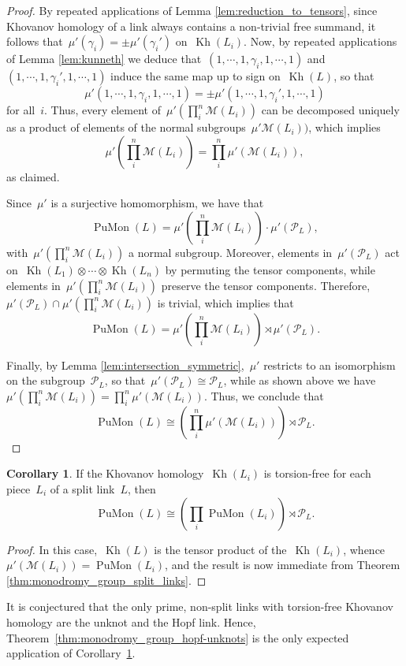 \documentclass{amsart}
\theoremstyle{definition}
\theoremstyle{definition}
\theoremstyle{definition}
\theoremstyle{definition}
\newtheorem{corollary}[theorem]{Corollary}
\newcommand{\calM}{\mathcal{M}}
\newcommand{\calP}{\mathcal{P}} %
\DeclareMathOperator{\PuMon}{PuMon}
\DeclareMathOperator{\Kh}{Kh}
\begin{document}
\begin{proof}
By repeated applications of Lemma \ref{lem:reduction_to_tensors}, since Khovanov homology of a link always contains a non-trivial free summand, it follows that~$\mu'(\gamma_i) = \pm\mu'(\gamma_i')$ on~$\Kh(L_i)$. Now, by repeated applications of Lemma \ref{lem:kunneth} we deduce that~$(1, \cdots, 1, \gamma_i, 1, \cdots, 1)$ and~$(1, \cdots, 1, \gamma_i', 1, \cdots, 1)$ induce the same map up to sign on~$\Kh(L)$, so that 
$$\mu'(1, \cdots, 1, \gamma_i, 1, \cdots, 1) = \pm \mu'(1, \cdots, 1, \gamma_i', 1, \cdots, 1)$$ 
for all~$i$. Thus, every element of~$\mu'(\prod_i^n\calM(L_i))$ can be decomposed uniquely as a product of elements of the normal subgroups~$\mu'\calM (L_i))$, which implies~$$\mu'\left(\prod_i^n\calM(L_i)\right)= \prod_i^n\mu'(\calM (L_i)),$$ 
as claimed.

Since~$\mu'$ is a surjective homomorphism, we have that 
\[\PuMon(L) = \mu'\left(\prod_i^n\calM(L_i)\right)\cdot \mu'(\calP_L),\] with~$\mu'(\prod_i^n\calM(L_i))$ a normal subgroup. Moreover, elements in~$\mu'(\calP_L)$ act on~$\Kh(L_1)\otimes\cdots\otimes \Kh(L_n)$ by permuting the tensor components, while elements in~$\mu'(\prod_i^n\calM(L_i))$ preserve the tensor components. Therefore,~$\mu'(\calP_L) \cap \mu'(\prod_i^n\calM(L_i))$ is trivial, which implies that~$$\PuMon(L) = \mu'\left(\prod_i^n\calM(L_i)\right)\rtimes \mu'(\calP_L).$$

Finally, by Lemma \ref{lem:intersection_symmetric},~$\mu'$ restricts to an isomorphism on the subgroup~$\calP_L$, so that~$\mu'(\calP_L)\cong \calP_L$, while as shown above we have~$\mu'(\prod_i^n\calM(L_i))= \prod_i^n\mu'(\calM (L_i))$. Thus, we conclude that 
$$\PuMon(L) \cong \left(\prod_i^n\mu'(\calM (L_i))\right) \rtimes \calP_L.$$
\end{proof}

\begin{corollary}\label{cor:refined formula when there is no torsion}
    If the Khovanov homology~$\Kh(L_i)$ is torsion-free for each piece~$L_i$ of a split link~$L$, then 
   ~$$ \PuMon(L)\cong \left(\prod _i \PuMon(L_i)\right)\rtimes \calP_L.$$
\end{corollary}

\begin{proof}
    In this case,~$\Kh(L)$ is the tensor product of the~$\Kh(L_i)$, whence~$\mu'(\calM(L_i)) = \PuMon(L_i)$, and the result is now immediate from Theorem \ref{thm:monodromy_group_split_links}.
\end{proof}

It is conjectured \cite{ShumakovitchTorsion} that the only prime, non-split links with torsion-free Khovanov homology are the unknot and the Hopf link. Hence, Theorem~\ref{thm:monodromy_group_hopf-unknots} is the only expected application of Corollary~\ref{cor:refined formula when there is no torsion}. 
\end{document}
